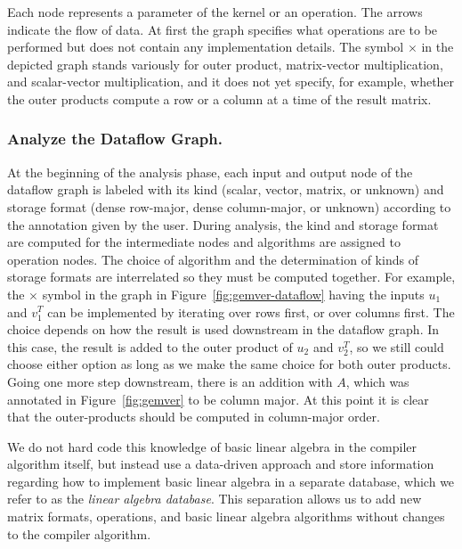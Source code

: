 \documentclass[runningheads]{llncs}
\begin{document}
Each node represents a parameter of the kernel or an operation.  The arrows 
indicate the flow of data. At first the graph specifies what operations are to be performed but does not contain any implementation details. The symbol $\times$ in the depicted graph stands variously for outer product, matrix-vector multiplication, and scalar-vector multiplication, and it does not yet specify, for example, whether the outer products compute a row or a column at a time of the result matrix.

\subsubsection{Analyze the Dataflow Graph.}

At the beginning of the analysis phase, each input and output node of the dataflow graph is labeled with its kind (scalar, vector, matrix, or unknown) and storage format (dense row-major, dense column-major, or unknown) according to the annotation given by the user.  During analysis, the kind and storage format are computed for the intermediate nodes and algorithms are assigned to operation nodes. The choice of algorithm and the determination of kinds of storage formats are interrelated so they must be computed together.  For example, the $\times$ symbol in the graph in Figure~\ref{fig:gemver-dataflow} having the inputs $u_1$ and $v_1^T$ can be implemented by iterating over rows first, or over columns first. The choice depends on how the result is used downstream in the dataflow graph.  In this case, the result is added to the outer product of $u_2$ and $v_2^T$, so we still could choose either option as long as we make the same choice for both outer products. Going one more step downstream, there is an addition with $A$, which was annotated in Figure~\ref{fig:gemver} to be column major. At this point it is clear that the outer-products should be computed in column-major order.

We do not hard code this knowledge of basic linear algebra in the compiler algorithm itself, but instead use a data-driven approach and store information regarding how to implement basic linear algebra in a separate database, which we refer to as the \emph{linear algebra database}.  This separation allows us to add new matrix formats, operations, and basic linear algebra algorithms without changes to the
compiler algorithm. 
\end{document}
